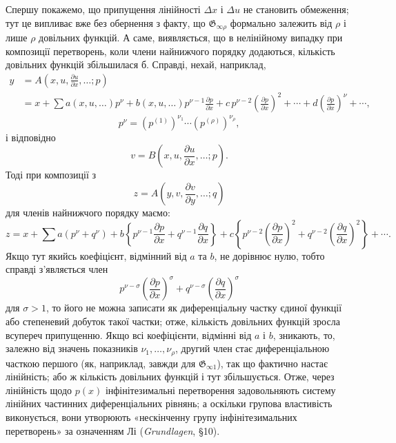 \documentclass[11pt]{article}
\providecommand{\G}{\mathfrak G}
\providecommand{\D}{\Delta}
\providecommand{\p}{\partial}
\begin{document}
Спершу покажемо, що припущення лінійності \(\D x\) і \(\D u\) не становить обмеження; тут це випливає вже без обернення з факту, що \(\G_{\infty\rho}\) формально залежить від \(\rho\) і лише \(\rho\) довільних функцій. А саме, виявляється, що в нелінійному випадку при композиції перетворень, коли члени найнижчого порядку додаються, кількість довільних функцій збільшилася б. Справді, нехай, наприклад,
\[
\begin{aligned}
y&=A\!\left(x,u,\frac{\p u}{\p x},\ldots;p\right)\\
&=x+\sum a(x,u,\ldots)p^\nu
+b(x,u,\ldots)p^{\nu-1}\frac{\p p}{\p x}
+c\,p^{\nu-2}\left(\frac{\p p}{\p x}\right)^2+\cdots
+d\left(\frac{\p p}{\p x}\right)^\nu+\cdots,
\end{aligned}
\]
\[
p^\nu=(p^{(1)})^{\nu_1}\cdots(p^{(\rho)})^{\nu_\rho},
\]
і відповідно
\[
v=B\!\left(x,u,\frac{\p u}{\p x},\ldots;p\right).
\]
Тоді при композиції з
\[
z=A\!\left(y,v,\frac{\p v}{\p y},\ldots;q\right)
\]
для членів найнижчого порядку маємо:
\[
z=x+\sum a(p^\nu+q^\nu)+
b\left\{p^{\nu-1}\frac{\p p}{\p x}+q^{\nu-1}\frac{\p q}{\p x}\right\}
+c\left\{p^{\nu-2}\left(\frac{\p p}{\p x}\right)^2
+q^{\nu-2}\left(\frac{\p q}{\p x}\right)^2\right\}+\cdots.
\]
Якщо тут якийсь коефіцієнт, відмінний від \(a\) та \(b\), не дорівнює нулю, тобто справді з'являється член
\[
p^{\nu-\sigma}\left(\frac{\p p}{\p x}\right)^\sigma
+q^{\nu-\sigma}\left(\frac{\p q}{\p x}\right)^\sigma
\]
для \(\sigma>1\), то його не можна записати як диференціальну частку єдиної функції або степеневий добуток такої частки; отже, кількість довільних функцій зросла всупереч припущенню. Якщо всі коефіцієнти, відмінні від \(a\) і \(b\), зникають, то, залежно від значень показників \(\nu_1,\ldots,\nu_\rho\), другий член стає диференціальною часткою першого (як, наприклад, завжди для \(\G_{\infty1}\)), так що фактично настає лінійність; або ж кількість довільних функцій і тут збільшується. Отже, через лінійність щодо \(p(x)\) інфінітезимальні перетворення задовольняють систему лінійних частинних диференціальних рівнянь; а оскільки групова властивість виконується, вони утворюють «нескінченну групу інфінітезимальних перетворень» за означенням Лі (\emph{Grundlagen}, \S{}10).
\end{document}
